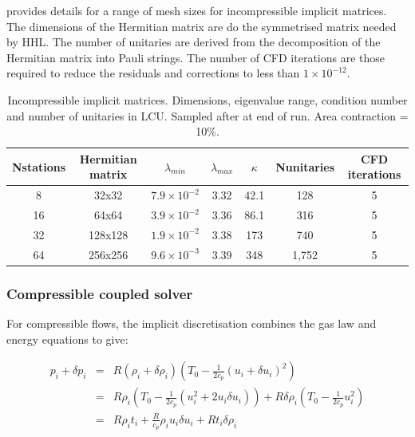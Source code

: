  provides details for a range of mesh sizes for
incompressible implicit matrices. The dimensions of the Hermitian matrix are do the symmetrised
matrix needed by HHL. The number of unitaries are derived from the decomposition of
the Hermitian matrix into Pauli strings.
The number of CFD iterations are those required to reduce the residuals and 
corrections to less than $1 \times 10^{-12}$.

\begin{table}[h]
  \centering
  \begin{tabular}{c c c c c c c}
    \toprule
    Nstations & Hermitian matrix &  $\lambda_{min}$ & $\lambda_{max}$ & $\kappa$ & Nunitaries & CFD iterations \\
    \midrule
     8   &   32x32     &$7.9\times10^{-2}$ & 3.32      & 42.1     & 128   &  5  \\
     16  &   64x64     &$3.9\times10^{-2}$ & 3.36      & 86.1     & 316   &  5  \\
     32  &  128x128    &$1.9\times10^{-2}$ & 3.38      & 173      & 740   &  5  \\
     64  &  256x256    &$9.6\times10^{-3}$ & 3.39      & 348      & 1,752 &  5  \\
    \bottomrule
  \end{tabular}
  \caption{Incompressible implicit matrices.
           Dimensions, eigenvalue range, condition number and number of unitaries in LCU.
           Sampled after at end of run. Area contraction = 10\%.}
  \label{tab-imp-incomp}
\end{table}



\subsubsection{Compressible coupled solver}
\label{subsubsec-comp-couple}

For compressible flows, the implicit discretisation combines the gas law and energy equations
to give:

\begin{equation}
  \begin{array}{rcl}
    p_i + \delta p_i &=& R (\rho_i + \delta \rho_i)(T_0 - \frac{1}{2c_p}(u_i + \delta u_i)^2) \\[8pt]
                     &=& R\rho_i(T_0 - \frac{1}{2c_p}(u_i^2 + 2 u_i \delta u_i)) +
                         R \delta \rho_i (T_0 - \frac{1}{2c_p}u_i^2) \\[8pt]
                     &=& R\rho_i t_i + \frac{R}{c_p} \rho_i u_i \delta u_i + Rt_i \delta \rho_i 
  \end{array}
  \label{eqn-euler-1d-disc4}
\end{equation}


